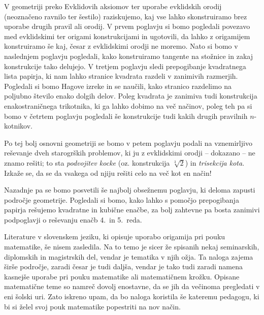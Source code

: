 V geometriji preko Evklidovih aksiomov ter uporabe evklidskih orodij (neoznačeno ravnilo ter šestilo) raziskujemo, kaj vse lahko skonstruiramo brez uporabe drugih pravil ali orodij. V prvem poglavju si bomo pogledali povezavo med evklidskimi ter origami konstrukcijami in ugotovili, da lahko z origamijem konstruiramo še kaj, česar z evklidskimi orodji ne moremo. Nato si bomo v naslednjem poglavju pogledali, kako konstruiramo tangente na stožnice in zakaj konstrukcije tako delujejo. V tretjem poglavju sledi prepogibanje kvadratnega lista papirja, ki nam lahko stranice kvadrata razdeli v zanimivih razmerjih. Pogledali si bomo Hagove izreke in se naučili, kako stranico razdelimo na poljubno število enako dolgih delov. Poleg kvadrata je zanimiva tudi konstrukcija enakostraničnega trikotnika, ki ga lahko dobimo na več načinov, poleg teh pa si bomo v četrtem poglavju pogledali še konstrukcije tudi kakih drugih pravilnih $n$-kotnikov.

Po tej bolj osnovni geometriji se bomo v petem poglavju podali na vznemirljivo reševanje dveh starogrških problemov, ki ju z evklidskimi orodji -- dokazano -- ne znamo rešiti; to sta \emph{podvojitev kocke} (oz. konstrukcija $\sqrt[3]{2}$) in \emph{trisekcija kota}. Izkaže se, da se da vsakega od njiju rešiti celo na več kot en način!

Nazadnje pa se bomo posvetili še najbolj obsežnemu poglavju, ki deloma zapusti področje geometrije. Pogledali si bomo, kako lahko s pomočjo prepogibanja papirja rešujemo kvadratne in kubične enačbe, za bolj zahtevne pa bosta zanimivi podpoglavji o reševanju enačb 4.\ in 5.\ reda.

Literature v slovenskem jeziku, ki opisuje uporabo origamija pri pouku matematike, še nisem zasledila. Na to temo je sicer že spisanih nekaj seminarskih, diplomskih in magistrskih del, vendar je tematika v njih ožja. Ta naloga zajema širše področje, zaradi česar je tudi daljša, vendar je tako tudi zaradi namena kasnejše uporabe pri pouku matematike ali matematičnem krožku. Opisane matematične teme so namreč dovolj enostavne, da se jih da večinoma pregledati v eni šolski uri. Zato iskreno upam, da bo naloga koristila še kateremu pedagogu, ki bi si želel svoj pouk matematike popestriti na nov način.